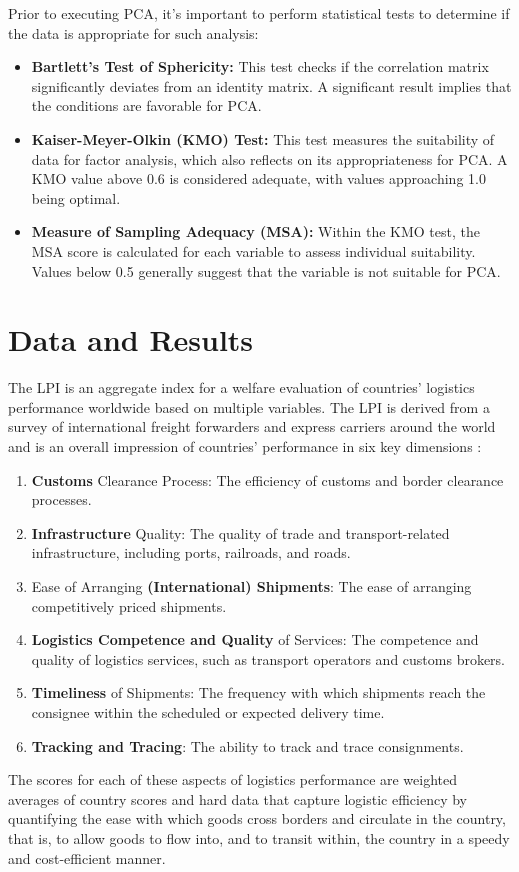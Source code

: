 \documentclass[conference]{IEEEtran}
\begin{document}
Prior to executing PCA, it's important to perform statistical tests to determine if the data is appropriate for such analysis:

\begin{itemize}
    \item \textbf{Bartlett’s Test of Sphericity:} This test checks if the correlation matrix significantly deviates from an identity matrix. A significant result implies that the conditions are favorable for PCA.
    \item \textbf{Kaiser-Meyer-Olkin (KMO) Test:} This test measures the suitability of data for factor analysis, which also reflects on its appropriateness for PCA. A KMO value above 0.6 is considered adequate, with values approaching 1.0 being optimal.
    \item \textbf{Measure of Sampling Adequacy (MSA):} Within the KMO test, the MSA score is calculated for each variable to assess individual suitability. Values below 0.5 generally suggest that the variable is not suitable for PCA.
\end{itemize}

\section{Data and Results}
The LPI \cite{worldbank2024} is an aggregate index for a welfare evaluation of countries’ logistics performance worldwide based on multiple variables. The LPI is derived from a survey of international freight forwarders and express carriers around the world and is an overall impression of countries’ performance in six key dimensions \cite{WBreport2016,WBreport2018}:
\begin{enumerate}
    \item \textbf{Customs} Clearance Process: The efficiency of customs and border clearance processes.
    \item \textbf{Infrastructure} Quality: The quality of trade and transport-related infrastructure, including ports, railroads, and roads.
    \item Ease of Arranging \textbf{(International) Shipments}: The ease of arranging competitively priced shipments.
    \item \textbf{Logistics Competence and Quality } of Services: The competence and quality of logistics services, such as transport operators and customs brokers.
    \item \textbf{Timeliness} of Shipments: The frequency with which shipments reach the consignee within the scheduled or expected delivery time.
    \item \textbf{Tracking and Tracing}: The ability to track and trace consignments.
\end{enumerate}
 The scores for each of these aspects of logistics performance are weighted averages of country scores and hard data that capture logistic efficiency by quantifying the ease with which goods cross borders and circulate in the country, that is, to allow goods to flow into, and to transit within, the country in a speedy and cost-efficient manner.
\end{document}
